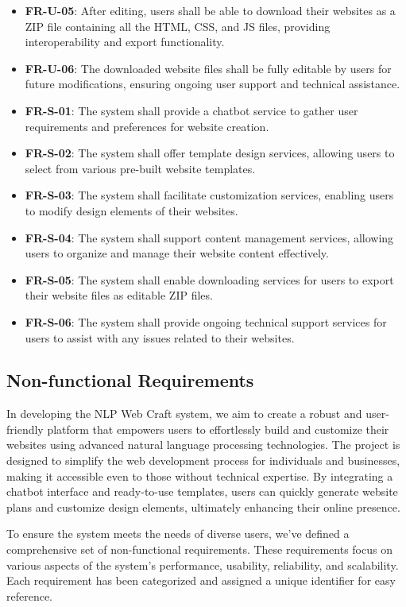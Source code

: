\documentclass[12pt]{report}
\begin{document}
\begin{itemize}
    \item \textbf{FR-U-05}: After editing, users shall be able to download their websites as a ZIP file containing all the HTML, CSS, and JS files, providing interoperability and export functionality.
    \item \textbf{FR-U-06}: The downloaded website files shall be fully editable by users for future modifications, ensuring ongoing user support and technical assistance.
    \item \textbf{FR-S-01}: The system shall provide a chatbot service to gather user requirements and preferences for website creation.
    \item \textbf{FR-S-02}: The system shall offer template design services, allowing users to select from various pre-built website templates.
    \item \textbf{FR-S-03}: The system shall facilitate customization services, enabling users to modify design elements of their websites.
    \item \textbf{FR-S-04}: The system shall support content management services, allowing users to organize and manage their website content effectively.
    \item \textbf{FR-S-05}: The system shall enable downloading services for users to export their website files as editable ZIP files.
    \item \textbf{FR-S-06}: The system shall provide ongoing technical support services for users to assist with any issues related to their websites.
\end{itemize}

\subsection{Non-functional Requirements}

In developing the NLP Web Craft system, we aim to create a robust and user-friendly platform that empowers users to effortlessly build and customize their websites using advanced natural language processing technologies. The project is designed to simplify the web development process for individuals and businesses, making it accessible even to those without technical expertise. By integrating a chatbot interface and ready-to-use templates, users can quickly generate website plans and customize design elements, ultimately enhancing their online presence.

To ensure the system meets the needs of diverse users, we've defined a comprehensive set of non-functional requirements. These requirements focus on various aspects of the system's performance, usability, reliability, and scalability. Each requirement has been categorized and assigned a unique identifier for easy reference.
\end{document}
